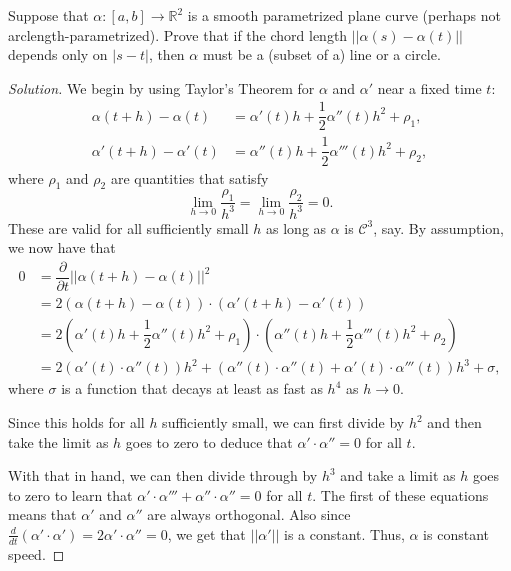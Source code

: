 \documentclass[Shifrin_Solutions_Spring_2018]{subfiles}
\begin{document}
\clearpage

\begin{exercise}
Suppose that $\alpha:[a,b]\rightarrow \mathbb{R}^2$ is a smooth parametrized plane curve 
(perhaps not arclength-parametrized). Prove that if the chord length 
$||\alpha(s) - \alpha(t) ||$ depends only on $|s-t|$, then $\alpha$ must be a (subset of a) 
line or a circle.
\end{exercise}

\begin{proof}[Solution] We begin by using Taylor's Theorem for $\alpha$ 
and $\alpha'$ near a fixed time $t$:
\begin{align*}
\alpha(t+h) - \alpha(t) & = \alpha'(t) h + \dfrac{1}{2}\alpha''(t) h^2 + \rho_1,  \\
\alpha'(t+h) - \alpha'(t) & = \alpha''(t) h + \dfrac{1}{2}\alpha'''(t) h^2 + \rho_2,
\end{align*}
where $\rho_1$ and $\rho_2$ are quantities that satisfy
\[
\lim_{h\rightarrow 0} \dfrac{\rho_1}{h^3} = \lim_{h\rightarrow 0} \dfrac{\rho_2}{h^3} = 0.
\]
These are valid for all sufficiently small $h$ as long as $\alpha$ is $\mathcal{C}^3$, say.
By assumption, we now have that
\[
\begin{split}
0  & = \dfrac{\partial}{\partial t}\left|\left| \alpha(t+h) -\alpha(t) \right|\right|^2 \\
	& = 2\left( \alpha(t+h) - \alpha(t) \right) \cdot \left( \alpha'(t+h) - \alpha'(t) \right) \\
	& = 2\left( \alpha'(t) h + \dfrac{1}{2}\alpha''(t) h^2 + \rho_1 \right) 
	\cdot \left( \alpha''(t) h + \dfrac{1}{2}\alpha'''(t) h^2 + \rho_2 \right) \\
	& = 2(\alpha'(t)\cdot \alpha''(t) ) h^2 + ( \alpha''(t)\cdot \alpha''(t) + \alpha'(t) 
	\cdot \alpha'''(t) ) h^3 + \sigma,
\end{split}
\]
where $\sigma$ is a function that decays at least as fast as $h^4$ as $h\rightarrow 0$.

Since this holds for all $h$ sufficiently small, we can first divide by $h^2$ and then take
the limit as $h$ goes to zero to
deduce that $\alpha' \cdot \alpha'' = 0$ 
for all $t$. 

With that in hand, we can then divide through by $h^3$ and take a limit as $h$ goes to zero
to learn that $\alpha'\cdot \alpha''' +\alpha'' \cdot \alpha''=0$ for all $t$.
The first of these equations means that $\alpha'$ and $\alpha''$ are always orthogonal. Also 
since $\frac{d}{dt}(\alpha'\cdot\alpha') = 2\alpha'\cdot\alpha''=0$, we get that $||\alpha'||$ is 
a constant. Thus, $\alpha$ is constant speed.


\end{proof}
\end{document}
